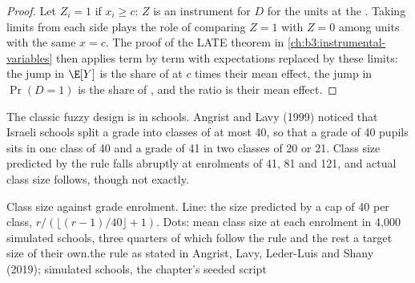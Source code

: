 \begin{proof}
Let $Z_i = 1$ if $x_i \ge c$: $Z$ is an instrument for $D$ for the units at the
. Taking limits from each side plays the role of comparing $Z = 1$ with
$Z = 0$ among units with the same $x = c$. The proof of the LATE theorem in
\cref{ch:b3:instrumental-variables} then applies term by term with
expectations replaced by these limits: the jump in $\E[Y]$ is the share of
 at $c$ times their mean effect, the jump in $\Pr(D = 1)$ is the share
of , and the ratio is their mean effect.
\end{proof}

The classic fuzzy design is in schools. Angrist and Lavy (1999) noticed that
Israeli schools split a grade into classes of at most 40, so that a grade of 40
pupils sits in one class of 40 and a grade of 41 in two classes of 20 or 21.
Class size predicted by the rule falls abruptly at enrolments of 41, 81 and
121, and actual class size follows, though not exactly.

\begin{omchart}{Class size against grade enrolment. Line: the size predicted by a
cap of 40 per class, $r/(\lfloor (r-1)/40 \rfloor + 1)$. Dots: mean class size at
each enrolment in 4{,}000 simulated schools, three quarters of which follow the
rule and the rest a target size of their own.}{the rule as stated in
Angrist, Lavy, Leder-Luis and Shany (2019); simulated schools, the chapter's
seeded script}
\end{omchart}

\label{lst:b3:regression-discontinuity:fuzzy}

